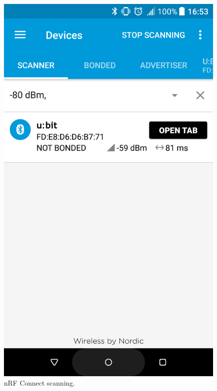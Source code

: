 \documentclass[11pt,a4paper]{article}
\begin{document}
\begin{figure}[ht]
\centering
\begin{minipage}{0.5\linewidth}
\centering
\includegraphics[width=0.9\linewidth]{example_connect_scan.png}
\caption{nRF Connect scanning.}
\label{fig::example_scanning}
\end{minipage}%
\begin{minipage}{0.5\linewidth}
\centering

\end{minipage}
\end{figure}
\end{document}
